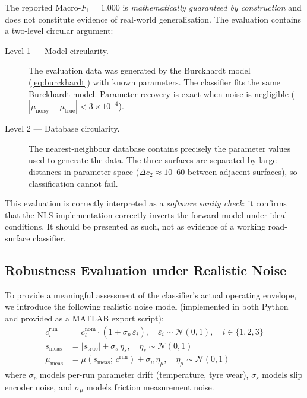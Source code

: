 \documentclass[11pt,a4paper]{article}
\begin{document}
The reported $\text{Macro-}F_1 = 1.000$ is \emph{mathematically guaranteed by
construction} and does not constitute evidence of real-world generalisation.
The evaluation contains a two-level circular argument:

\begin{description}
  \item[Level 1 --- Model circularity.]
        The evaluation data was generated by the Burckhardt model
        (\cref{eq:burckhardt}) with known parameters.
        The classifier fits the same Burckhardt model.
        Parameter recovery is exact when noise is negligible
        ($|\mu_\mathrm{noisy} - \mu_\mathrm{true}| < 3 \times 10^{-4}$).
  \item[Level 2 --- Database circularity.]
        The nearest-neighbour database contains precisely the parameter values
        used to generate the data.
        The three surfaces are separated by large distances in parameter space
        ($\Delta c_2 \approx 10$--$60$ between adjacent surfaces), so
        classification cannot fail.
\end{description}

This evaluation is correctly interpreted as a \emph{software sanity check}:
it confirms that the NLS implementation correctly inverts the forward model
under ideal conditions.
It should be presented as such, not as evidence of a working road-surface
classifier.

\subsection{Robustness Evaluation under Realistic Noise}

To provide a meaningful assessment of the classifier's actual operating envelope,
we introduce the following realistic noise model (implemented in both Python and
provided as a MATLAB export script):
\begin{align}
  c_i^\mathrm{run} &= c_i^\mathrm{nom} \cdot (1 + \sigma_p \, \varepsilon_i),
  \quad \varepsilon_i \sim \mathcal{N}(0,1),
  \quad i \in \{1,2,3\}
  \label{eq:noise_param} \\
  s_\mathrm{meas} &= |s_\mathrm{true}| + \sigma_s \, \eta_s,
  \quad \eta_s \sim \mathcal{N}(0,1)
  \label{eq:noise_slip} \\
  \mu_\mathrm{meas} &= \mu(s_\mathrm{meas};\, c^\mathrm{run}) + \sigma_\mu \, \eta_\mu,
  \quad \eta_\mu \sim \mathcal{N}(0,1)
  \label{eq:noise_mu}
\end{align}
where $\sigma_p$ models per-run parameter drift (temperature, tyre wear),
$\sigma_s$ models slip encoder noise, and $\sigma_\mu$ models friction
measurement noise.
\end{document}
